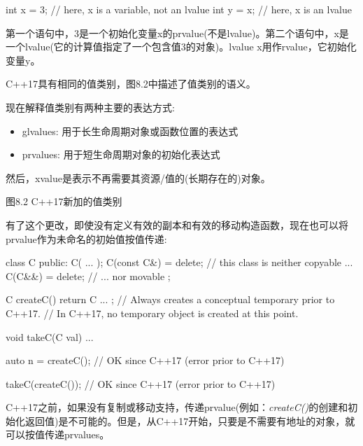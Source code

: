 \begin{codebox}[cpp]
int x = 3; // here, x is a variable, not an lvalue
int y = x; // here, x is an lvalue
\end{codebox}

第一个语句中，3是一个初始化变量x的prvalue(不是lvalue)。第二个语句中，x是一个lvalue(它的计算值指定了一个包含值3的对象)。lvalue x用作rvalue，它初始化变量y。\par


C++17具有相同的值类别，图8.2中描述了值类别的语义。\par

现在解释值类别有两种主要的表达方式:\par

\begin{itemize}
  \item glvalues: 用于长生命周期对象或函数位置的表达式
  \item prvalues: 用于短生命周期对象的初始化表达式
\end{itemize}

然后，xvalue是表示不再需要其资源/值的(长期存在的)对象。\par

图8.2 C++17新加的值类别\par



有了这个更改，即使没有定义有效的副本和有效的移动构造函数，现在也可以将prvalue作为未命名的初始值按值传递:\par

\begin{codebox}[cpp]
class C {
  public:
  C( ... );
  C(const C&) = delete; // this class is neither copyable ...
  C(C&&) = delete; // ... nor movable
};

C createC() {
  return C{ ... }; // Always creates a conceptual temporary prior to C++17.
} // In C++17, no temporary object is created at this point.

void takeC(C val) {
  ...
}

auto n = createC(); // OK since C++17 (error prior to C++17)

takeC(createC()); // OK since C++17 (error prior to C++17)
\end{codebox}

C++17之前，如果没有复制或移动支持，传递prvalue(例如：\textit{createC()}的创建和初始化返回值)是不可能的。但是，从C++17开始，只要是不需要有地址的对象，就可以按值传递prvalues。\par

